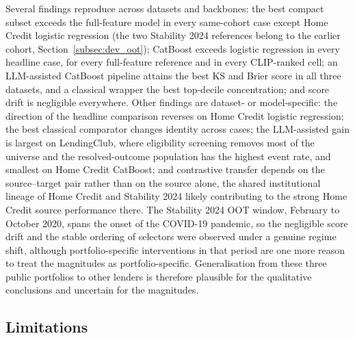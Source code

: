 \documentclass[final,5p,twocolumn]{elsarticle}
\begin{document}
Several findings reproduce across datasets and backbones: the best compact subset exceeds the full-feature model in every same-cohort case except Home Credit logistic regression (the two Stability 2024 references belong to the earlier cohort, Section~\ref{subsec:dev_oot}); CatBoost exceeds logistic regression in every headline case, for every full-feature reference and in every CLIP-ranked cell; an LLM-assisted CatBoost pipeline attains the best KS and Brier score in all three datasets, and a classical wrapper the best top-decile concentration; and score drift is negligible everywhere. Other findings are dataset- or model-specific: the direction of the headline comparison reverses on Home Credit logistic regression; the best classical comparator changes identity across cases; the LLM-assisted gain is largest on LendingClub, where eligibility screening removes most of the universe and the resolved-outcome population has the highest event rate, and smallest on Home Credit CatBoost; and contrastive transfer depends on the source--target pair rather than on the source alone, the shared institutional lineage of Home Credit and Stability 2024 likely contributing to the strong Home Credit source performance there. The Stability 2024 OOT window, February to October 2020, spans the onset of the COVID-19 pandemic, so the negligible score drift and the stable ordering of selectors were observed under a genuine regime shift, although portfolio-specific interventions in that period are one more reason to treat the magnitudes as portfolio-specific. Generalisation from these three public portfolios to other lenders is therefore plausible for the qualitative conclusions and uncertain for the magnitudes.

\subsection{Limitations}
\label{subsec:limitations}
\end{document}
